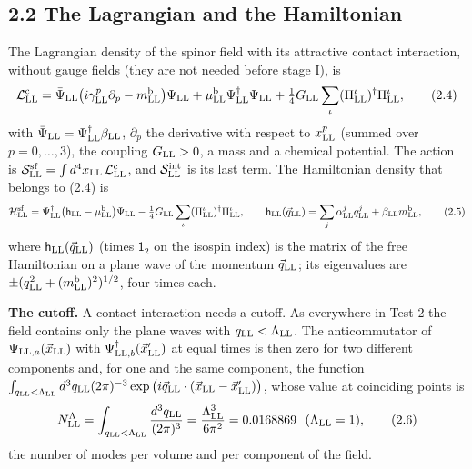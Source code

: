 \documentclass[
  10pt,
]{article}
\begin{document}
\hypertarget{the-lagrangian-and-the-hamiltonian}{%
\subsection{2.2 The Lagrangian and the
Hamiltonian}\label{the-lagrangian-and-the-hamiltonian}}

The Lagrangian density of the spinor field with its attractive contact
interaction, without gauge fields (they are not needed before stage I),
is
\[\mathcal L^{\rm c}_{\rm LL}=\bar\Psi_{\rm LL}\big(i\gamma^p_{\rm LL}\partial_p-m^{\rm b}_{\rm LL}\big)\Psi_{\rm LL}
+\mu^{\rm b}_{\rm LL}\Psi^\dagger_{\rm LL}\Psi_{\rm LL}
+\tfrac14G_{\rm LL}\sum_\iota(\Pi^\iota_{\rm LL})^\dagger\Pi^\iota_{\rm LL},\tag{2.4}\]
with \(\bar\Psi_{\rm LL}=\Psi^\dagger_{\rm LL}\beta_{\rm LL}\),
\(\partial_p\) the derivative with respect to \(x^p_{\rm LL}\) (summed
over \(p=0,\dots,3\)), the coupling \(G_{\rm LL}>0\), a mass and a
chemical potential. The action is
\(\mathcal S^{\rm sf}_{\rm LL}=\int d^4x_{\rm LL}\,\mathcal L^{\rm c}_{\rm LL}\),
and \(\mathcal S^{\rm int}_{\rm LL}\) is its last term. The Hamiltonian
density that belongs to (2.4) is
\[\mathcal H^{\rm sf}_{\rm LL}=\Psi^\dagger_{\rm LL}\big(\mathsf h_{\rm LL}-\mu^{\rm b}_{\rm LL}\big)\Psi_{\rm LL}
-\tfrac14G_{\rm LL}\sum_\iota(\Pi^\iota_{\rm LL})^\dagger\Pi^\iota_{\rm LL},\qquad
\mathsf h_{\rm LL}(\vec q_{\rm LL})=\sum_j\alpha^j_{\rm LL}q^j_{\rm LL}+\beta_{\rm LL}m^{\rm b}_{\rm LL},\tag{2.5}\]
where \(\mathsf h_{\rm LL}(\vec q_{\rm LL})\) (times \(\mathsf 1_2\) on
the isospin index) is the matrix of the free Hamiltonian on a plane wave
of the momentum \(\vec q_{\rm LL}\); its eigenvalues are
\(\pm(q_{\rm LL}^2+(m^{\rm b}_{\rm LL})^2)^{1/2}\), four times each.

\textbf{The cutoff.} A contact interaction needs a cutoff. As everywhere
in Test 2 the field contains only the plane waves with
\(q_{\rm LL}<\Lambda_{\rm LL}\). The anticommutator of
\(\Psi_{{\rm LL},a}(\vec x_{\rm LL})\) with
\(\Psi^\dagger_{{\rm LL},b}(\vec x'_{\rm LL})\) at equal times is then
zero for two different components and, for one and the same component,
the function
\(\int_{q_{\rm LL}<\Lambda_{\rm LL}}d^3q_{\rm LL}(2\pi)^{-3}\exp\big(i\vec q_{\rm LL}\cdot(\vec x_{\rm LL}-\vec x'_{\rm LL})\big)\),
whose value at coinciding points is
\[N^\Lambda_{\rm LL}=\int_{q_{\rm LL}<\Lambda_{\rm LL}}\frac{d^3q_{\rm LL}}{(2\pi)^3}=\frac{\Lambda_{\rm LL}^3}{6\pi^2}=0.0168869\ \ (\Lambda_{\rm LL}=1),\tag{2.6}\]
the number of modes per volume and per component of the field.
\end{document}
